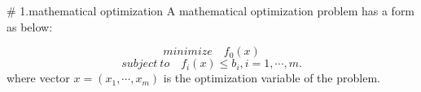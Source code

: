 

# 1.mathematical optimization
A mathematical optimization problem has a form as below:

\[
minimize \quad f_0(x)
\]
\[
subject \ to \quad f_i(x) \le b_i, i = 1,\cdots,m.
\]
where vector $x = (x_1,\cdots,x_m)$ is the optimization variable of the problem.

